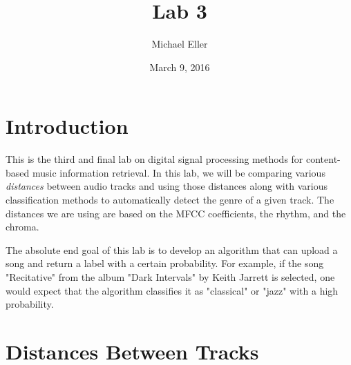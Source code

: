 \documentclass{article} %
\title{Lab 3}
\author{Michael Eller}
\date{March 9, 2016} %
\begin{document}
\maketitle

\tableofcontents
\clearpage
\section{Introduction}


This is the third and final lab on digital signal processing methods for content-based music information retrieval. In this lab, we will be comparing various \emph{distances} between audio
 tracks and using those distances along with various classification methods to  automatically detect the genre of a given track. 
The distances we are using are based on the MFCC coefficients, the rhythm, and the chroma. 

The absolute end goal of this lab is to develop an algorithm that can upload a song and return a label with a certain probability. For example, if the song "Recitative" from the album "Dark
Intervals" by Keith Jarrett is selected, one would expect that the algorithm classifies it as "classical" or "jazz" with a high probability. 


\section{Distances Between Tracks}
\end{document}
